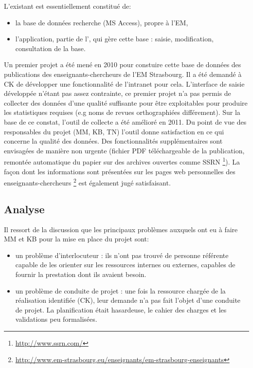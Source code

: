\documentclass{book}
\begin{document}
L'existant est essentiellement constitué de:
\begin{itemize}
\item la base de données recherche (MS Access), propre à l'EM,
\item l'application, partie de l', qui gère cette base : saisie, 
modification, consultation de la base.
\end{itemize}
Un premier projet a été mené en 2010 pour constuire cette base de données des
publications des enseignants-chercheurs de l'EM Strasbourg. Il a été demandé à 
CK de développer une fonctionnalité de l'intranet pour cela. L'interface de 
saisie développée n'étant pas assez contrainte, ce premier projet n'a pas 
permis de collecter des données d'une qualité suffisante pour être exploitables
pour produire les statistiques requises (e.g noms de revues orthographiées 
différement). Sur la base de ce constat, l'outil de collecte a été amélioré en 
2011. Du point de vue des responsables du projet (MM, KB, TN) l'outil donne 
satisfaction en ce qui concerne la qualité des données. Des fonctionnalités 
supplémentaires sont envisagées de manière non urgente (fichier PDF téléchargeable 
de la publication, remontée automatique du papier sur des archives ouvertes comme SSRN%
\footnote{\url{ http://www.ssrn.com/}}).
La façon dont les informations sont présentées sur les pages web personnelles
des enseignants-chercheurs%
\footnote{\url{http://www.em-strasbourg.eu/enseignants/em-strasbourg-enseignants}}
est également jugé satisfaisant.


\subsection{Analyse}

Il ressort de la discussion que les principaux problèmes auxquels ont eu à 
faire MM et KB pour la mise en place du projet sont:
\begin{itemize}
\item un problème d'interlocuteur : ils n'ont pas trouvé de personne référente 
capable de les orienter sur les ressources internes ou externes, capables de fournir 
la prestation dont ils avaient besoin.
\item un problème de conduite de projet : une fois la ressource chargée de la 
réalisation identifiée (CK), leur demande n'a pas fait l'objet d'une conduite
de projet. La planification était hasardeuse, le cahier des charges et
les validations peu formalisées.
\end{itemize}
\end{document}
